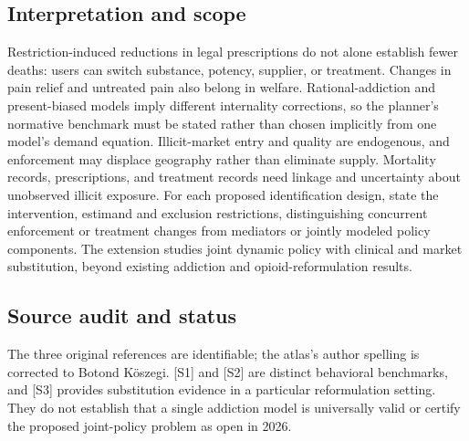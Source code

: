 \documentclass[11pt,a4paper]{article}
\begin{document}
\subsection*{Interpretation and scope}
Restriction-induced reductions in legal prescriptions do not alone establish fewer deaths: users can switch substance, potency, supplier, or treatment. Changes in pain relief and untreated pain also belong in welfare. Rational-addiction and present-biased models imply different internality corrections, so the planner's normative benchmark must be stated rather than chosen implicitly from one model's demand equation. Illicit-market entry and quality are endogenous, and enforcement may displace geography rather than eliminate supply. Mortality records, prescriptions, and treatment records need linkage and uncertainty about unobserved illicit exposure. For each proposed identification design, state the intervention, estimand and exclusion restrictions, distinguishing concurrent enforcement or treatment changes from mediators or jointly modeled policy components. The extension studies joint dynamic policy with clinical and market substitution, beyond existing addiction and opioid-reformulation results.

\subsection*{Source audit and status}
The three original references are identifiable; the atlas's author spelling is corrected to Botond Köszegi. [S1] and [S2] are distinct behavioral benchmarks, and [S3] provides substitution evidence in a particular reformulation setting. They do not establish that a single addiction model is universally valid or certify the proposed joint-policy problem as open in 2026.
\end{document}
